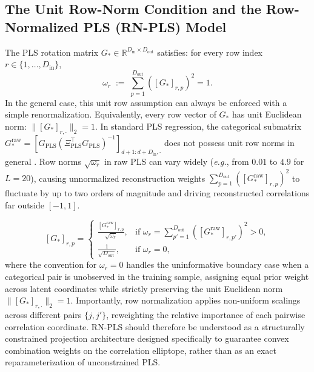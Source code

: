 \documentclass[default,sn-mathphys,Numbered]{sn-jnl}
\theoremstyle{thmstyleone}
\theoremstyle{thmstylethree}
\theoremstyle{thmstyletwo}
\newcommand{\inp}{\text{in}}
\newcommand{\outp}{\text{out}}
\begin{document}
\subsection{The Unit Row-Norm Condition and the Row-Normalized PLS (RN-PLS) Model}

The PLS rotation matrix $G_* \in \mathbb{R}^{D_{\inp} \times D_{\outp}}$ satisfies: for every row index $r \in \{1, \ldots, D_{\inp}\}$,
\begin{equation}
\label{eq:unit_row_norm}
\omega_r \;:=\; \sum_{p=1}^{D_{\outp}} \left( [G_*]_{r, p} \right)^2 = 1.
\end{equation}
In the general case, this unit row assumption can always be enforced with a simple renormalization. Equivalently, every row vector of $G_*$ has unit Euclidean norm: $\|[G_*]_{r, \cdot}\|_2 = 1$.
% 
In standard PLS regression, the categorical submatrix $G_*^{\mathrm{raw}} = [G_{\mathrm{PLS}}(\Xi_{\mathrm{PLS}}^\top G_{\mathrm{PLS}})^{-1}]_{d+1:d+D_{\inp},\cdot}$ does not possess unit row norms in general \citep{wold_1975,hellandStructurePartialLeast1988,bouhlel_KPLSK,Bouhlel18}. Row norms $\sqrt{\omega_r}$ in raw PLS can vary widely (\textit{e.g.}, from $0.01$ to $4.9$ for $L=20$), causing unnormalized reconstruction weights $\sum_{p=1}^{D_{\outp}} ([G_*^{\mathrm{raw}}]_{r,p})^2$ to fluctuate by up to two orders of magnitude and driving reconstructed correlations far outside $[-1, 1]$.

\begin{equation}
\label{eq:row_normalization}
[G_*]_{r, p} =
\begin{cases}
\displaystyle\frac{[G_*^{\mathrm{raw}}]_{r, p}}{\sqrt{\omega_r}}, & \text{if } \omega_r = \sum_{p'=1}^{D_{\outp}} \left([G_*^{\mathrm{raw}}]_{r, p'}\right)^2 > 0, \\[8pt]
\displaystyle\frac{1}{\sqrt{D_{\outp}}}, & \text{if } \omega_r = 0,
\end{cases}
\end{equation}
where the convention for $\omega_r = 0$ handles the uninformative boundary case when a categorical pair is unobserved in the training sample, assigning equal prior weight across latent coordinates while strictly preserving the unit Euclidean norm $\|[G_*]_{r, \cdot}\|_2 = 1$.
Importantly, row normalization applies non-uniform scalings across different pairs $\{j, j'\}$, reweighting the relative importance of each pairwise correlation coordinate. RN-PLS should therefore be understood as a structurally constrained projection architecture designed specifically to guarantee convex combination weights on the correlation elliptope, rather than as an exact reparameterization of unconstrained PLS.
\end{document}
